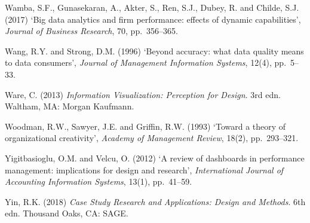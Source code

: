 \documentclass[11pt,a4paper]{article}
\numberwithin{figure}{section}
\numberwithin{table}{section}
\begin{document}
{\noindent\hypertarget{ref73}{}\begin{minipage}[t]{\dimexpr\linewidth-1.05cm\relax}Wamba, S.F., Gunasekaran, A., Akter, S., Ren, S.J., Dubey, R. and Childe, S.J. (2017) `Big data analytics and firm performance: effects of dynamic capabilities', \emph{Journal of Business Research}, 70, pp.~356--365.\end{minipage}\par\vspace{4pt}
\noindent\hypertarget{ref74}{}\begin{minipage}[t]{\dimexpr\linewidth-1.05cm\relax}Wang, R.Y. and Strong, D.M. (1996) `Beyond accuracy: what data quality means to data consumers', \emph{Journal of Management Information Systems}, 12(4), pp.~5--33.\end{minipage}\par\vspace{4pt}
\noindent\hypertarget{ref75}{}\begin{minipage}[t]{\dimexpr\linewidth-1.05cm\relax}Ware, C. (2013) \emph{Information Visualization: Perception for Design}. 3rd edn. Waltham, MA: Morgan Kaufmann.\end{minipage}\par\vspace{4pt}
\noindent\hypertarget{ref76}{}\begin{minipage}[t]{\dimexpr\linewidth-1.05cm\relax}Woodman, R.W., Sawyer, J.E. and Griffin, R.W. (1993) `Toward a theory of organizational creativity', \emph{Academy of Management Review}, 18(2), pp.~293--321.\end{minipage}\par\vspace{4pt}
\noindent\hypertarget{ref77}{}\begin{minipage}[t]{\dimexpr\linewidth-1.05cm\relax}Yigitbasioglu, O.M. and Velcu, O. (2012) `A review of dashboards in performance management: implications for design and research', \emph{International Journal of Accounting Information Systems}, 13(1), pp.~41--59.\end{minipage}\par\vspace{4pt}
\noindent\hypertarget{ref78}{}\begin{minipage}[t]{\dimexpr\linewidth-1.05cm\relax}Yin, R.K. (2018) \emph{Case Study Research and Applications: Design and Methods}. 6th edn. Thousand Oaks, CA: SAGE.\end{minipage}\par\vspace{4pt}
}
\end{document}
